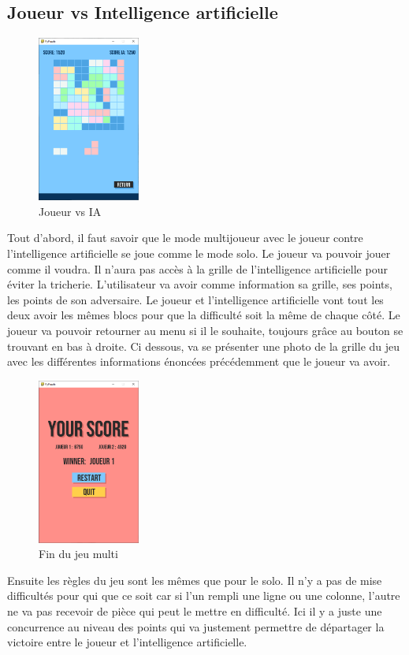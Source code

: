 \documentclass[a4paper]{report}
\begin{document}
\subsection{Joueur vs Intelligence artificielle}
\begin{figure}
    \centering
    \includegraphics[width=0.3\textwidth, trim=0pt 0pt 0pt 30pt]{images/3-playwithai.png}
    \caption{Joueur vs IA}
    \vspace{-10pt}
\end{figure}
Tout d'abord, il faut savoir que le mode multijoueur avec le joueur contre l'intelligence artificielle se joue comme le mode solo. Le joueur va pouvoir jouer comme il voudra. Il n'aura pas accès à la grille de l'intelligence artificielle pour éviter la tricherie. L'utilisateur va avoir comme information sa grille, ses points, les points de son adversaire. Le joueur et l'intelligence artificielle vont tout les deux avoir les mêmes blocs pour que la difficulté soit la même de chaque côté. Le joueur va pouvoir retourner au menu si il le souhaite, toujours grâce au bouton se trouvant en bas à droite. Ci dessous, va se présenter une photo de la grille du jeu avec les différentes informations énoncées précédemment que le joueur va avoir.\\

\begin{figure}
    \centering
    \includegraphics[width=0.3\textwidth, trim=0pt 0pt 0pt 30pt]{images/4-endmulti.png}
    \caption{Fin du jeu multi}
\end{figure}
Ensuite les règles du jeu sont les mêmes que pour le solo. Il n'y a pas de mise difficultés pour qui que ce soit car si l'un rempli une ligne ou une colonne, l'autre ne va pas recevoir de pièce qui peut le mettre en difficulté. Ici il y a juste une concurrence au niveau des points qui va justement permettre de départager la victoire entre le joueur et l'intelligence artificielle.\\
\end{document}
